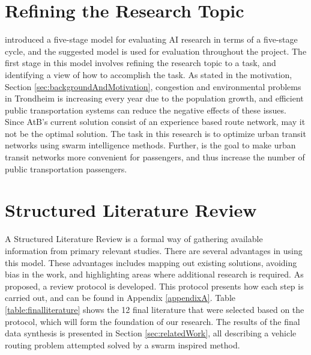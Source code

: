 \section{Refining the Research Topic}
\label{sec:definingResearchTopic}

\citet{cohen88} introduced a five-stage model for evaluating AI research in terms of a five-stage cycle, and the suggested model is used for evaluation throughout the project. The first stage in this model involves refining the research topic to a task, and identifying a view of how to accomplish the task. As stated in the motivation, Section \vref{sec:backgroundAndMotivation}, congestion and environmental problems in Trondheim is increasing every year due to the population growth, and efficient public transportation systems can reduce the negative effects of these issues. Since AtB's current solution consist of an experience based route network, may it not be the optimal solution. The task in this research is to optimize urban transit networks using swarm intelligence methods. Further, is the goal to make urban transit networks more convenient for passengers, and thus increase the number of public transportation passengers.

\section{Structured Literature Review}
\label{sec:structuredLiteratureReview}

A Structured Literature Review is a formal way of gathering available information from primary relevant studies\citep{kofod2014}. There are several advantages in using this model. These advantages includes mapping out existing solutions, avoiding bias in the work, and highlighting areas where additional research is required. As proposed, a review protocol is developed. This protocol presents how each step is carried out, and can be found in Appendix \vref{appendixA}. Table \ref{table:finalliterature} shows the 12 final literature that were selected based on the protocol, which will form the foundation of our research. The results of the final data synthesis is presented in Section \vref{sec:relatedWork}, all describing a vehicle routing problem attempted solved by a swarm inspired method.  %



